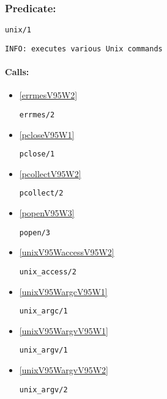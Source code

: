 \subsubsection{Predicate:} \label{unixV95W1}

\begin{verbatim}
unix/1
\end{verbatim}

{\small \begin{verbatim}
INFO: executes various Unix commands

\end{verbatim}}
\paragraph{Calls:} 
\begin{itemize}
\item \ref{errmesV95W2} 
\begin{verbatim}
errmes/2
\end{verbatim}

\item \ref{pcloseV95W1} 
\begin{verbatim}
pclose/1
\end{verbatim}

\item \ref{pcollectV95W2} 
\begin{verbatim}
pcollect/2
\end{verbatim}

\item \ref{popenV95W3} 
\begin{verbatim}
popen/3
\end{verbatim}

\item \ref{unixV95WaccessV95W2} 
\begin{verbatim}
unix_access/2
\end{verbatim}

\item \ref{unixV95WargcV95W1} 
\begin{verbatim}
unix_argc/1
\end{verbatim}

\item \ref{unixV95WargvV95W1} 
\begin{verbatim}
unix_argv/1
\end{verbatim}

\item \ref{unixV95WargvV95W2} 
\begin{verbatim}
unix_argv/2
\end{verbatim}


\end{itemize}
